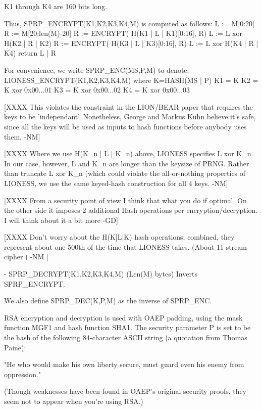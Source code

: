   K1 through K4 are 160 bits long.

  Thus, SPRP_ENCRYPT(K1,K2,K3,K4,M) is computed as follows:
            L := M[0:20]
            R := M[20:len(M)-20]
            R := ENCRYPT( H(K1 | L | K1)[0:16], R)
            L := L xor H(K2 | R | K2)
            R := ENCRYPT( H(K3 | L | K3)[0:16], R)
            L := L xor H(K4 | R | K4) 
            return L | R

  For convenience, we write SPRP_ENC(MS,P,M) to denote:
       LIONESS_ENCRYPT(K1,K2,K3,K4,M)
       where K=HASH(MS | P)
             K1 = K
             K2 = K xor 0x00...01
             K3 = K xor 0x00...02
             K4 = K xor 0x00...03

  [XXXX This violates the constraint in the LION/BEAR paper that
        requires the keys to be 'independant'.  Nonetheless, George
	and Markus Kuhn believe it's safe, since all the keys
        will be used as inputs to hash functions before anybody
        uses them. -NM]

  [XXXX Where we use H(K_n | L | K_n) above, LIONESS specifies 
        L xor K_n.  In our case, however, L and K_n are longer than
        the keysize of PRNG.  Rather than truncate L xor K_n (which
        could violate the all-or-nothing properties of LIONESS,
        we use the same keyed-hash construction for all 4 keys. -NM]

  [XXXX From a security point of view I think that what you do if
        optimal. On the other side it imposes 2 additional Hash
        operations per encryption/decryption. I will think about it a
        bit more -GD]

  [XXXX Don't worry about the H(K|L|K) hash operations; combined, they 
        represent about one 500th of the time that LIONESS takes.
        (About 11%
        stream cipher.) -NM ]

- SPRP_DECRYPT(K1,K2,K3,K4,M) (Len(M) bytes) Inverts SPRP_ENCRYPT.

  We also define SPRP_DEC(K,P,M) as the inverse of SPRP_ENC.
    
RSA encryption and decryption is used with OAEP padding, using the 
mask function MGF1 and hash function SHA1.  The security
parameter P is set to be the hash of the following 84-character ASCII
string (a quotation from Thomas Paine): 

     "He who would make his own liberty secure, must guard even his
      enemy from oppression." 

(Though weaknesses have been found in OAEP's original security proofs,
they seem not to appear when you're using RSA.)


